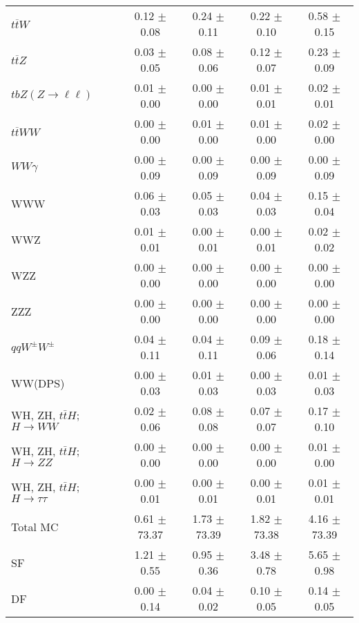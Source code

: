 \begin{tabular}{l|cccc}
                   $t\overline{t}W$ &  0.12 $\pm$  0.08 &  0.24 $\pm$  0.11 &  0.22 $\pm$  0.10 &  0.58 $\pm$  0.15 \\
                   $t\overline{t}Z$ &  0.03 $\pm$  0.05 &  0.08 $\pm$  0.06 &  0.12 $\pm$  0.07 &  0.23 $\pm$  0.09 \\
    $tbZ (Z \rightarrow \ell \ell)$ &  0.01 $\pm$  0.00 &  0.00 $\pm$  0.00 &  0.01 $\pm$  0.01 &  0.02 $\pm$  0.01 \\
                  $t\overline{t}WW$ &  0.00 $\pm$  0.00 &  0.01 $\pm$  0.00 &  0.01 $\pm$  0.00 &  0.02 $\pm$  0.00 \\
                         $WW\gamma$ &  0.00 $\pm$  0.09 &  0.00 $\pm$  0.09 &  0.00 $\pm$  0.09 &  0.00 $\pm$  0.09 \\
                                WWW &  0.06 $\pm$  0.03 &  0.05 $\pm$  0.03 &  0.04 $\pm$  0.03 &  0.15 $\pm$  0.04 \\
                                WWZ &  0.01 $\pm$  0.01 &  0.00 $\pm$  0.01 &  0.00 $\pm$  0.01 &  0.02 $\pm$  0.02 \\
                                WZZ &  0.00 $\pm$  0.00 &  0.00 $\pm$  0.00 &  0.00 $\pm$  0.00 &  0.00 $\pm$  0.00 \\
                                ZZZ &  0.00 $\pm$  0.00 &  0.00 $\pm$  0.00 &  0.00 $\pm$  0.00 &  0.00 $\pm$  0.00 \\
                 $qqW^{\pm}W^{\pm}$ &  0.04 $\pm$  0.11 &  0.04 $\pm$  0.11 &  0.09 $\pm$  0.06 &  0.18 $\pm$  0.14 \\
                            WW(DPS) &  0.00 $\pm$  0.03 &  0.01 $\pm$  0.03 &  0.00 $\pm$  0.03 &  0.01 $\pm$  0.03 \\
WH, ZH, $t\bar{t}H$; $H \rightarrow WW$ &  0.02 $\pm$  0.06 &  0.08 $\pm$  0.08 &  0.07 $\pm$  0.07 &  0.17 $\pm$  0.10 \\
WH, ZH, $t\bar{t}H$; $H \rightarrow ZZ$ &  0.00 $\pm$  0.00 &  0.00 $\pm$  0.00 &  0.00 $\pm$  0.00 &  0.01 $\pm$  0.00 \\
WH, ZH, $t\bar{t}H$; $H \rightarrow \tau\tau$ &  0.00 $\pm$  0.01 &  0.00 $\pm$  0.01 &  0.00 $\pm$  0.01 &  0.01 $\pm$  0.01 \\
\hline\hline
                           Total MC &  0.61 $\pm$ 73.37 &  1.73 $\pm$ 73.39 &  1.82 $\pm$ 73.38 &  4.16 $\pm$ 73.39 \\
\hline
                                 SF &  1.21 $\pm$  0.55 &  0.95 $\pm$  0.36 &  3.48 $\pm$  0.78 &  5.65 $\pm$  0.98 \\
                                 DF &  0.00 $\pm$  0.14 &  0.04 $\pm$  0.02 &  0.10 $\pm$  0.05 &  0.14 $\pm$  0.05 \\

\end{tabular}
